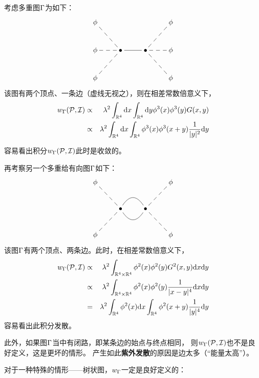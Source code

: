 \begin{example}
考虑多重图$\Gamma$为如下：
$$
  \xymatrix{
     \phi          \ar@{--}[rd]
    &&&\phi        \ar@{--}[ld]
  \\
     \phi          \ar@{--}[r]
    &\bullet       \ar@{-}[r]
    &\bullet
    &\phi          \ar@{--}[l]
  \\
    \phi           \ar@{--}[ru]
    &&&\phi        \ar@{--}[lu]
  }
$$
该图有两个顶点、一条边（虚线无视之），则在相差常数倍意义下，
\begin{eqnarray*}
     w_\Gamma(\mathcal{P},\mathcal{I})
&\propto&
     \lambda^2
     \int_{\mathbb{R}^4}\mathrm{d} x
     \int_{\mathbb{R}^4}\mathrm{d} y
       \phi^3(x)
       \phi^3(y)
       G(x,y)\\
&\propto&
     \lambda^2
     \int_{\mathbb{R}^4}\mathrm{d} x
     \int_{\mathbb{R}^4}
       \phi^3(x)
       \phi^3(x+y)
       \frac{1}{|y|^2}
       \mathrm{d} y
\end{eqnarray*}

容易看出积分$w_\Gamma(\mathcal{P},\mathcal{I})$此时是收敛的。
\label{phi^4费曼规则-example}
\end{example}

\begin{example}
再考察另一个多重给有向图$\Gamma$如下：
$$
  \xymatrix{
     \phi          \ar@{--}[rd]
    &&&\phi        \ar@{--}[ld]
  \\
    &\bullet       \ar@{-}@/^1.3pc/[r]
                   \ar@{-}@/_1.3pc/[r]
    &\bullet
    &
  \\
    \phi           \ar@{--}[ru]
    &&&\phi        \ar@{--}[lu]
  }
$$
该图$\Gamma$有两个顶点、两条边。此时，在相差常数倍意义下，
\begin{eqnarray*}
     w_\Gamma(\mathcal{P},\mathcal{I})
&\propto&
     \lambda^2
     \int_{\mathbb{R}^4\times\mathbb{R}^4}
       \phi^2(x)\phi^2(y)G^2(x,y)
       \mathrm{d} x\mathrm{d} y\\
&\propto&
     \lambda^2
     \int_{\mathbb{R}^4\times\mathbb{R}^4}
       \phi^2(x)\phi^2(y)
       \frac{1}{|x-y|^4}
       \mathrm{d} x\mathrm{d} y\\
&=&
     \lambda^2
     \int_{\mathbb{R}^4}
       \phi^2(x)
       \mathrm{d} x
     \int_{\mathbb{R}^4}
       \phi^2(x+y)
       \frac{1}{|y|^4}
       \mathrm{d} y
\end{eqnarray*}
容易看出此积分发散。
\label{phi^4费曼规则-发散example}
\end{example}

此外，如果图$\Gamma$当中有闭路，即某条边的始点与终点相同，
则$w_\Gamma(\mathcal{P},\mathcal{I})$也不是良好定义，这是更坏的情形。
产生如此\textbf{紫外发散}的原因是边太多（“能量太高”）。

对于一种特殊的情形——树状图，$w_\Gamma$一定是良好定义的：

